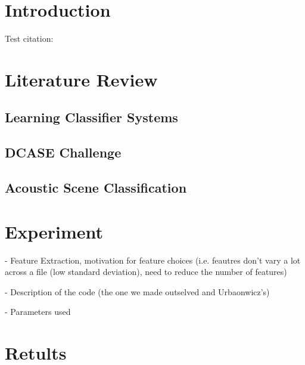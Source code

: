 \documentclass[11pt]{article}
\begin{document}
\begin{multicols}{2}

\section{Introduction}


Test citation: \cite{Anderson2016}

\lipsum[1]




\section{Literature Review}





\subsection{Learning Classifier Systems}





\subsection{DCASE Challenge}





\subsection{Acoustic Scene Classification}





\section{Experiment}



- Feature Extraction, motivation for feature choices (i.e. feautres don't vary a lot across a file (low standard deviation), need to reduce the number of features)

- Description of the code (the one we made outselved and Urbaonwicz's)

- Parameters used







\section{Retults}



\end{multicols}
\end{document}
